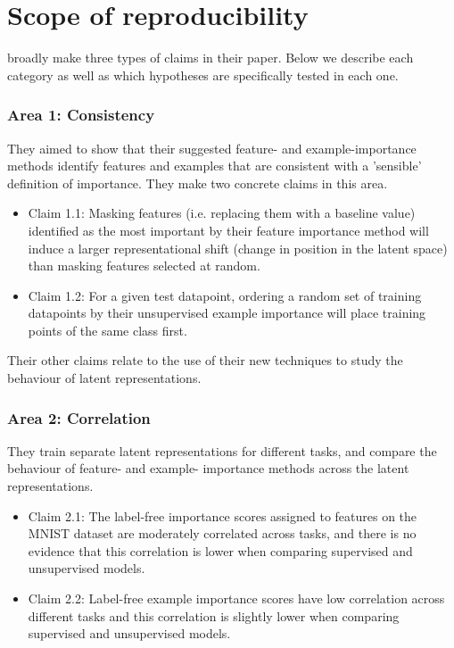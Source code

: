 \section{Scope of reproducibility}
\label{sec:scope}

\citet{crabbe2022label} broadly make three types of claims in their paper. Below we describe each category as well as which hypotheses are specifically tested in each one.

\subsubsection{Area 1: Consistency} They aimed to show that their suggested feature- and example-importance methods identify features and examples that are consistent with a 'sensible' definition of importance. They make two concrete claims in this area.
\begin{itemize}
    \label{claim11}
    \item Claim 1.1: Masking features (i.e. replacing them with a baseline value) identified as the most important by their feature importance method will induce a larger representational shift (change in position in the latent space) than masking features selected at random. 
    \label{claim12}
    \item Claim 1.2: For a given test datapoint, ordering a random set of training datapoints by their unsupervised example importance will place training points of the same class first. 
\end{itemize}

Their other claims relate to the use of their new techniques to study the behaviour of latent representations. 

\subsubsection{Area 2: Correlation}
They train separate latent representations for different tasks, and compare the behaviour of feature- and example- importance methods across the latent representations.

\begin{itemize}
\label{claim21}
\item Claim 2.1: The label-free importance scores assigned to features on the MNIST dataset are moderately correlated across tasks, and there is no evidence that this correlation is lower when comparing supervised and unsupervised models.

\label{claim22}
\item Claim 2.2: Label-free example importance scores have low correlation across different tasks and this correlation is slightly lower when comparing supervised and unsupervised models.
\end{itemize}


